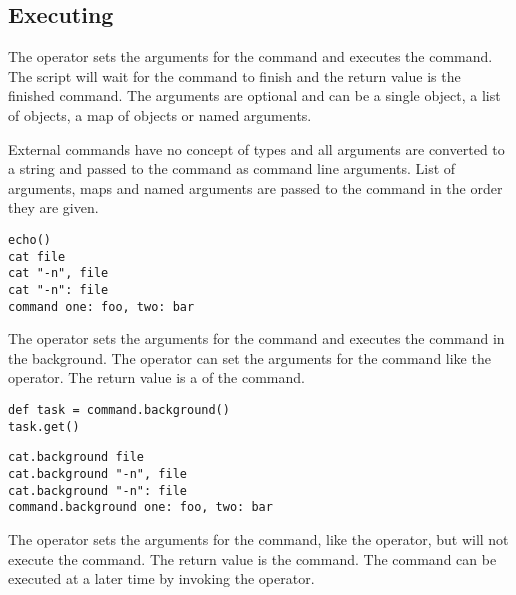 \subsection{Executing} 

%

The  operator sets the arguments for the command and executes the
command. The script will wait for the command to finish and the return value 
is the finished command.
The arguments are optional and can be a single object, a list of objects,
a map of objects or named arguments. 

External commands have no concept of 
types and all arguments are converted
to a string and passed to the command as command line arguments.
List of arguments, maps and named arguments are passed to the command
in the order they are given.

\begin{lstlisting}[style=Groovybash, label={lst:example_call_op}, title={Execute command with no arguments or with specified arguments either direct or by key=value pairs.}]
echo()
cat file
cat "-n", file
cat "-n": file
command one: foo, two: bar
\end{lstlisting}

%

The  operator sets the arguments for the command and executes the
command in the background. 
The operator can set the arguments for the command like the 
operator. The return value is a \cite{future13} of the command.

\begin{lstlisting}[style=Groovybash, label={lst:example_background1}, title={Starts the command in the background and waits for the command to finish at some later time.}]
def task = command.background()
task.get()
\end{lstlisting}

\begin{lstlisting}[style=Groovybash, label={lst:example_background2}, title={Pass arguments to the command either direct or by key=value pairs.}]
cat.background file
cat.background "-n", file
cat.background "-n": file
command.background one: foo, two: bar
\end{lstlisting}


%

The  operator sets the arguments for the command, like 
the  operator, but will not execute the command. The return
value is the command. The command can be executed at a later time by invoking
the  operator.

